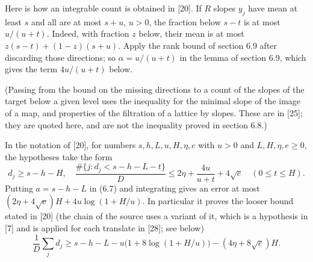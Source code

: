 \documentclass[11pt,letterpaper]{article}
\begin{document}
{Here is how an integrable count is obtained in [20]. If $R$ slopes $y_j$ have mean at least $s$ and all are at most $s+u$, $u>0$, the fraction below $s-t$ is at most $u/(u+t)$. Indeed, with fraction $z$ below, their mean is at most $z(s-t)+(1-z)(s+u)$. Apply the rank bound of section 6.9 after discarding those directions; so $\alpha=u/(u+t)$ in the lemma of section 6.9, which gives the term $4u/(u+t)$ below.

(Passing from the bound on the missing directions to a count of the slopes of the target below a given level uses the inequality for the minimal slope of the image of a map, and properties of the filtration of a lattice by slopes. These are in [25]; they are quoted here, and are not the inequality proved in section 6.8.)

In the notation of [20], for numbers $s,h,L,u,H,\eta,e$ with $u>0$ and $L,H,\eta,e\ge0$, the hypotheses take the form
\begin{equation}\label{D:109}
 d_j\ge s-h-H,\quad
 \frac{\#\{j:d_j<s-h-L-t\}}{D}\le 2\eta+\frac{4u}{u+t}+4\sqrt e
 \quad(0\le t\le H).
\end{equation}
Putting $a=s-h-L$ in (6.7) and integrating gives an error at most $(2\eta+4\sqrt e)H+4u\log(1+H/u)$. In particular it proves the looser bound stated in [20] (the chain of the source uses a variant of it, which is a hypothesis in [7] and is applied for each translate in [28]; see below)
\begin{equation}\label{D:110}
 \frac1D\sum_j d_j\ge s-h-L-u\big(1+8\log(1+H/u)\big)
                      -(4\eta+8\sqrt e)H .
\end{equation}
}
\end{document}
